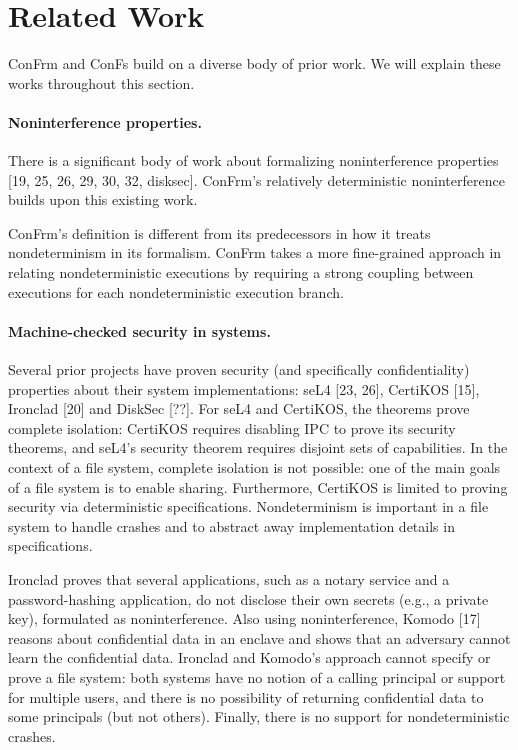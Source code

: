 \section{Related Work}

ConFrm and ConFs build on a diverse body of prior work. We will explain these works throughout this section. 

\paragraph{Noninterference properties.} There is a significant body of work about formalizing noninterference properties [19, 25, 26, 29, 30, 32, disksec]. ConFrm’s relatively deterministic noninterference builds upon this existing work. 

ConFrm’s definition is different from its predecessors in how it treats nondeterminism in its formalism. ConFrm takes a more fine-grained approach in relating nondeterministic executions by requiring a strong coupling between executions for each nondeterministic execution branch. 

\paragraph{Machine-checked security in systems.} 
Several prior projects have proven security (and specifically confidentiality) properties about their system implementations: seL4 [23, 26], CertiKOS [15], Ironclad [20] and DiskSec [??]. For seL4 and CertiKOS, the theorems prove complete isolation: CertiKOS requires disabling IPC to prove its security theorems, and seL4’s security theorem requires disjoint sets of capabilities. In the context of a file system, complete isolation is not possible: one of the main goals of a file system is to enable sharing. Furthermore, CertiKOS is limited to proving security via deterministic specifications. Nondeterminism is important in a file system to handle crashes and to abstract away implementation details in specifications. 


Ironclad proves that several applications, such as a notary service and a password-hashing application, do not disclose their own secrets (e.g., a private key), formulated as noninterference. Also using noninterference, Komodo [17] reasons about confidential data in an enclave and shows that an adversary cannot learn the confidential data. Ironclad and Komodo’s approach cannot specify or prove a file system: both systems have no notion of a calling principal or support for multiple users, and there is no possibility of returning confidential data to some principals (but not others). Finally, there is no support for nondeterministic crashes.


